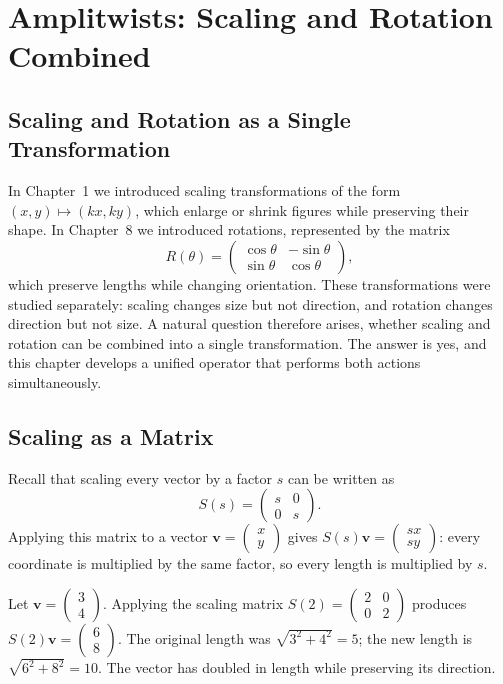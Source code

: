 \chapter{Amplitwists: Scaling and Rotation Combined}
\label{ch:ch15-amplitwists}

\section{Scaling and Rotation as a Single Transformation}

In Chapter~1 we introduced scaling transformations of the form
$(x,y)\mapsto(kx,ky)$, which enlarge or shrink figures while preserving
their shape. In Chapter~8 we introduced rotations, represented by the
matrix
\[
R(\theta)=
\begin{pmatrix}
\cos\theta & -\sin\theta\\
\sin\theta & \cos\theta
\end{pmatrix},
\]
which preserve lengths while changing orientation. These transformations
were studied separately: scaling changes size but not direction, and
rotation changes direction but not size. A natural question therefore
arises, whether scaling and rotation can be combined into a single
transformation. The answer is yes, and this chapter develops a unified
operator that performs both actions simultaneously.

\section{Scaling as a Matrix}

Recall that scaling every vector by a factor $s$ can be written as
\[
S(s)=
\begin{pmatrix}
s & 0\\
0 & s
\end{pmatrix}.
\]
Applying this matrix to a vector $\mathbf v = \begin{pmatrix} x\\ y
\end{pmatrix}$ gives $S(s)\mathbf v = \begin{pmatrix} sx\\ sy
\end{pmatrix}$: every coordinate is multiplied by the same factor, so
every length is multiplied by $s$.

\begin{example}
Let $\mathbf v = \begin{pmatrix} 3\\ 4 \end{pmatrix}$. Applying the
scaling matrix $S(2) = \begin{pmatrix} 2&0\\ 0&2 \end{pmatrix}$ produces
$S(2)\mathbf v = \begin{pmatrix} 6\\ 8 \end{pmatrix}$. The original
length was $\sqrt{3^2+4^2}=5$; the new length is $\sqrt{6^2+8^2}=10$. The
vector has doubled in length while preserving its direction.
\end{example}

